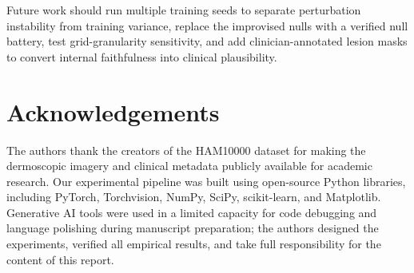 \documentclass[conference]{IEEEtran}
\begin{document}
Future work should run multiple training seeds to separate perturbation
instability from training variance, replace the improvised nulls with a
verified null battery, test grid-granularity sensitivity, and add
clinician-annotated lesion masks to convert internal faithfulness into
clinical plausibility.

\section*{Acknowledgements}
The authors thank the creators of the HAM10000 dataset for making the
dermoscopic imagery and clinical metadata publicly available for academic
research. Our experimental pipeline was built using open-source Python
libraries, including PyTorch, Torchvision, NumPy, SciPy, scikit-learn, and
Matplotlib. Generative AI tools were used in a limited capacity for
code debugging and language polishing during manuscript preparation;
the authors designed the experiments, verified all empirical results, and
take full responsibility for the content of this report.
\end{document}
